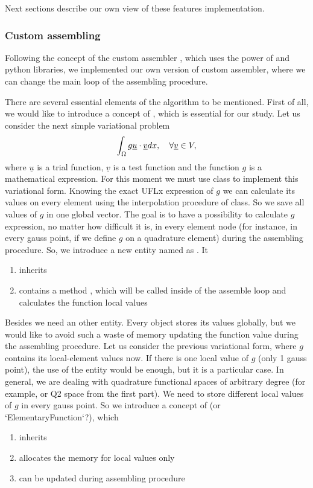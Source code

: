 \documentclass[12pt]{article}
\begin{document}
Next sections describe our own view of these features implementation.

\subsubsection{Custom assembling}

Following the concept of the custom assembler \parencite{test_custom_assembler}, which uses the power of  and  python libraries, we implemented our own version of custom assembler, where we can change the main loop of the assembling procedure.

There are several essential elements of the algorithm to be mentioned. First of all, we would like to introduce a concept of , which is essential for our study. Let us consider the next simple variational problem 
$$ \int_\Omega g \underline{u} \cdot \underline{v} dx, \quad \forall \underline{v} \in V, $$
where $\underline{u}$ is a trial function, $\underline{v}$ is a test function and the function $g$ is a mathematical expression. For this moment we must use  class to implement this variational form. Knowing the exact UFLx expression of $g$ we can calculate its values on every element using the interpolation procedure of  class. So we save all values of $g$ in one global vector. The goal is to have a possibility to calculate $g$ expression, no matter how difficult it is, in every element node (for instance, in every gauss point, if we define $g$ on a quadrature element) during the assembling procedure. So, we introduce a new entity named as . It
\begin{enumerate}
    \item inherits 
    \item contains a method , which will be called inside of the assemble loop and calculates the function local values
\end{enumerate}

Besides  we need an other entity. Every  object stores its values globally, but we would like to avoid such a waste of memory updating the function value during the assembling procedure. Let us consider the previous variational form, where $g$ contains its local-element values now. If there is one local value of $g$ (only 1 gauss point), the use of the  entity would be enough, but it is a particular case. In general, we are dealing with quadrature functional spaces of arbitrary degree (for example,  or Q2 space from the first part). We need to store different local values of $g$ in every gauss point. So we introduce a concept of  (or `ElementaryFunction`?), which 
\begin{enumerate}
    \item inherits 
    \item allocates the memory for local values only
    \item can be updated during assembling procedure
\end{enumerate}
\end{document}
